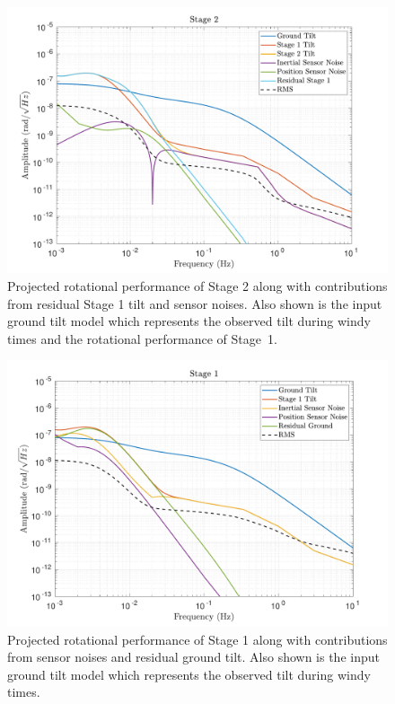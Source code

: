 \documentclass [12pt, proquest]{uwthesis}[2019]
\begin{document}
\begin{figure}[!h]
\begin{center}
\includegraphics[width=\textwidth]{cBRS_Model_ST2RX.pdf}
\caption[Projected rotational performance of Stage 2]{Projected rotational performance of Stage 2 along with contributions from residual Stage 1 tilt and sensor noises. Also shown is the input ground tilt model which represents the observed tilt during windy times and the rotational performance of Stage~1.}
\label{cBRS2R}
\end{center}
\end{figure}

\begin{figure}[!h]
\begin{center}
\includegraphics[width=\textwidth]{cBRS_Model_ST1RX.pdf}
\caption[Projected rotational performance of Stage 1]{Projected rotational performance of Stage 1 along with contributions from sensor noises and residual ground tilt. Also shown is the input ground tilt model which represents the observed tilt during windy times.}
\label{cBRS1R}
\end{center}
\end{figure}
\end{document}
